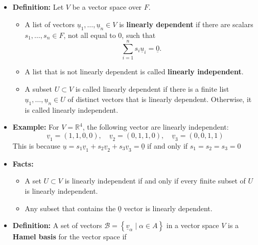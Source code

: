 \documentclass[11pt,twoside]{report}
\newcommand{\bbR}{{\mathbb{R}}}
\newcommand{\vecnot}{\underline}
\begin{document}
\begin{itemize}
\item \textbf{Definition:} 
Let $V$ be a vector space over $F$.
\begin{itemize}
\item A list of vectors $\vecnot{u}_1, \ldots, \vecnot{u}_n \in V $ is  \textbf{linearly dependent} if there are scalars $s_1, \ldots, s_n \in F$, not all equal to $0$, such that
\begin{equation*}
\sum_{i=1}^n s_i \vecnot{u}_i = \vecnot{0}.
\end{equation*}
\item  A list that is not linearly dependent is called \textbf{linearly independent}. 

\item A  subset $U \subset V$ is called linearly dependent if there is a finite list $\vecnot{u}_1, \ldots, \vecnot{u}_n \in U$ of distinct vectors that is linearly dependent.
Otherwise, it is called linearly independent.

\end{itemize}

\item \textbf{Example:} For $V=\bbR^4$, the following vector are linearly independent: %
\[
\vecnot{v}_1=(1,1,0,0), \quad \vecnot{v}_2=(0,1,1,0), \quad \vecnot{v}_3=(0,0,1,1)
\]
This is because  $\vecnot{u} = s_1 \vecnot{v}_1 + s_2  \vecnot{v}_2 + s_3  \vecnot{v}_3 = \vecnot{0}$ if and only if  $s_1 \!=\! s_2 \!=\! s_3 \!=\! 0$%


\item \textbf{Facts:} 
\begin{itemize}
\item  A set $U \subset V$ is linearly independent if and only if every finite subset of $U$ is linearly independent.
\item Any subset that contains the $\vecnot{0}$ vector is linearly dependent. 
\end{itemize}

\item \textbf{Definition:} %
A set  of vectors  $\mathcal{B} = \left\{ \vecnot{v}_{\alpha} \mid \alpha \in A \right\}$  in a vector space $V$ is a  \textbf{Hamel basis} for the vector space if %


\end{itemize}
\end{document}
